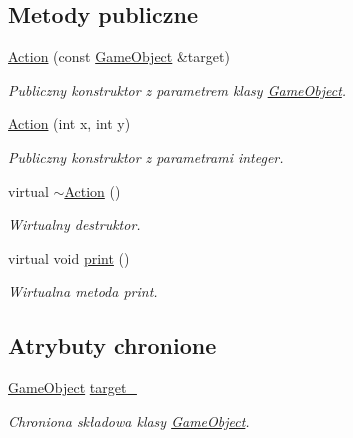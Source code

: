 \subsection*{Metody publiczne}
\begin{DoxyCompactItemize}
\item 
\hyperlink{classmodel_1_1Action_a0c62dc2f134f0feb4bc1eb5ac9ce5e67}{Action} (const \hyperlink{classmodel_1_1GameObject}{Game\+Object} \&target)
\begin{DoxyCompactList}\small\item\em Publiczny konstruktor z parametrem klasy \hyperlink{classmodel_1_1GameObject}{Game\+Object}. \end{DoxyCompactList}\item 
\hyperlink{classmodel_1_1Action_a0293d4a2d9f4bd4bf9f6b4427f83d531}{Action} (int x, int y)
\begin{DoxyCompactList}\small\item\em Publiczny konstruktor z parametrami integer. \end{DoxyCompactList}\item 
\mbox{\label{classmodel_1_1Action_a6c34264ee8e8ce12366b2b39b9397568}} 
virtual \hyperlink{classmodel_1_1Action_a6c34264ee8e8ce12366b2b39b9397568}{$\sim$\+Action} ()
\begin{DoxyCompactList}\small\item\em Wirtualny destruktor. \end{DoxyCompactList}\item 
virtual void \hyperlink{classmodel_1_1Action_a2955dbb4a69e38a48aa07d730fe2d77c}{print} ()
\begin{DoxyCompactList}\small\item\em Wirtualna metoda print. \end{DoxyCompactList}\end{DoxyCompactItemize}
\subsection*{Atrybuty chronione}
\begin{DoxyCompactItemize}
\item 
\hyperlink{classmodel_1_1GameObject}{Game\+Object} \hyperlink{classmodel_1_1Action_aaa02d0e5308513cd6832c6cd1ac7157f}{target\+\_\+}
\begin{DoxyCompactList}\small\item\em Chroniona składowa klasy \hyperlink{classmodel_1_1GameObject}{Game\+Object}. \end{DoxyCompactList}\end{DoxyCompactItemize}


